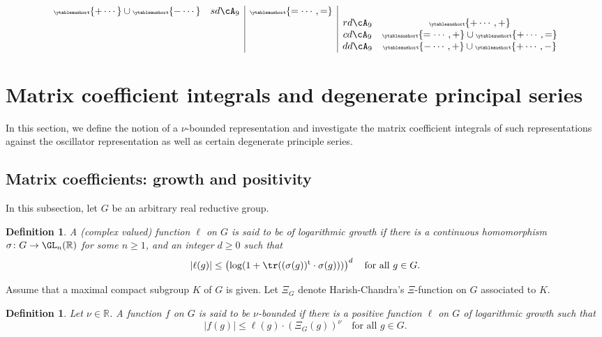 \documentclass[12pt,a4paper]{amsart}
\def\abs#1{\left|{#1}\right|}
\newcommand{\R}{\mathbb R}
\numberwithin{equation}{section}
\newtheorem{dfnl}[thm]{Definition}
\theoremstyle{remark}
\let\ytb=\ytableaushort
\newcommand{\tytb}[1]{{\tiny\ytb{#1}}}
\begin{document}
{\begin{equation}
\begin{array}{cc|c|cc}
                                                            \tytb{+\cdots} \cup\tytb{-\cdots}    & sd\cA_{9} & \tytb{=\cdots,=}                 \\
                        &                    &                & rd\cA_{9} &\tytb{+\cdots,+}                                   \\
                        &                    &                & cd\cA_{9} &\tytb{=\cdots,+}  \cup \tytb{+\cdots,=}                \\
                        &                    &                & dd\cA_{9} &\tytb{-\cdots,+} \cup \tytb{+\cdots,-}                       \\
\end{array}
\end{equation}
}


\section{Matrix coefficient integrals and degenerate principal series}\label{sec:Integrals}

In this section, we define the notion of a $\nu$-bounded representation and investigate the
matrix coefficient integrals of such representations against the oscillator representation as well as certain
degenerate principle series.

\subsection{Matrix coefficients: growth and positivity}

In this subsection, let $G$ be an arbitrary  real reductive group.
\begin{dfnl}
  A (complex valued) function $\ell$ on $G$ is said to be of \emph{logarithmic
    growth} if there is a continuous homomorphism
  $\sigma\colon G\rightarrow \GL_n(\R)$ for some $n\geq 1$, and an integer
  $d\geq 0$ such that
  \[
    \abs{\ell(g)}\leq \left(\log(1+\tr((\sigma(g))^\mathrm{t} \cdot
      \sigma(g)))\right)^d\quad \textrm{for all }g\in G.
  \]

\end{dfnl}

Assume that a maximal compact subgroup $K$ of $G$ is given. Let $\Xi_{G}$ denote Harish-Chandra's $\Xi$-function on $G$ associated to $K$.
\begin{dfnl}
  Let $\nu\in \R$. A function $f$ on $G$ is said to be \emph{$\nu$-bounded} if
  there is a positive function $\ell$ on $G$ of logarithmic growth such that
  \[
    \abs{f(g)}\leq \ell(g) \cdot (\Xi_G (g))^\nu\quad \textrm{for all }g\in G.
  \]
\end{dfnl}
\end{document}
